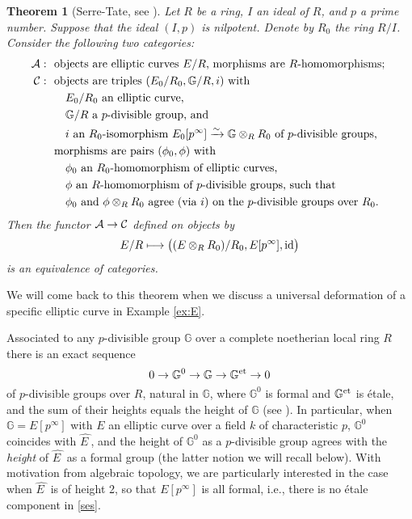 \documentclass{gtpart}
\newtheorem{thm}{Theorem}
\theoremstyle{definition}
\theoremstyle{remark}
\newcommand{\mb}[1]{\mathbb{#1}}
\newcommand{\CA}{{\cal A}}
\newcommand{\CC}{{\cal C}}
\newcommand{\BG}{{\mb G}}
\newcommand{\HE}{\widehat{E~}\!}
\newcommand{\id}{{\rm id}}
\numberwithin{equation}{section}
\numberwithin{thm}{section}
\begin{document}
\begin{thm}[Serre-Tate, see {\cite[2.9.1]{KM}}]
\label{thm:serretate}
 Let $R$ be a ring, $I$ an ideal of $R$, and $p$ a prime number.  
 Suppose that the ideal $(I,p)$ is nilpotent.  Denote by $R_0$ the ring 
 $R/I$.  Consider the following two categories: 
 \begin{equation*}
 \begin{split}
  \CA: ~ & ~ \text{objects are elliptic curves $E/R$, morphisms are $R$-homomorphisms; }\\
  \CC: ~ & ~ \text{objects are triples $(E_0/R_0, \BG/R, i)$ with }\\
         & ~ \quad \text{$E_0/R_0$ an elliptic curve, }\\
         & ~ \quad \text{$\BG/R$ a $p$-divisible group, and }\\
         & ~ \quad \text{$i$ an $R_0$-isomorphism $E_0[p^\infty] \xrightarrow{\sim} \BG \otimes_R R_0$ of $p$-divisible groups, }\\
         & ~ \text{morphisms are pairs $(\phi_0, \phi)$ with }\\
         & ~ \quad \text{$\phi_0$ an $R_0$-homomorphism of elliptic curves, }\\
         & ~ \quad \text{$\phi$ an $R$-homomorphism of $p$-divisible groups, such that }\\
         & ~ \quad \text{$\phi_0$ and $\phi \otimes_R R_0$ agree (via $i$) on the $p$-divisible groups over $R_0$.  }
 \end{split}
 \end{equation*}
 Then the functor $\CA \to \CC$ defined on objects by 
 \[
  E/R \longmapsto \big( (E \otimes_R R_0) / R_0, E[p^\infty], \id \big) 
 \]
 is an equivalence of categories.  
\end{thm}

We will come back to this theorem when we discuss a universal 
deformation of a specific elliptic curve in Example \ref{ex:E}.  

Associated to any $p$-divisible group $\BG$ over a complete noetherian 
local ring $R$ there is an exact sequence 
\begin{equation}
\label{ses}
 0 \to \BG^0 \to \BG \to \BG^{\rm et} \to 0 
\end{equation}
of $p$-divisible groups over $R$, natural in $\BG$, where $\BG^0$ is 
formal and $\BG^{\rm et}$ is \'etale, and the sum of their heights 
equals the height of $\BG$ (see \cite[Section 2.2]{tate}).  In 
particular, when $\BG = E[p^\infty]$ with $E$ an elliptic curve over a 
field $k$ of characteristic $p$, $\BG^0$ coincides with $\HE$, and the 
height of $\BG^0$ as a $p$-divisible group agrees with the {\em height} 
of $\HE$ as a formal group (the latter notion we will recall below).  
With motivation from algebraic topology, we are particularly interested 
in the case when $\HE$ is of height 2, so that $E[p^\infty]$ is all 
formal, i.e., there is no \'etale component in \eqref{ses}.  
\end{document}
